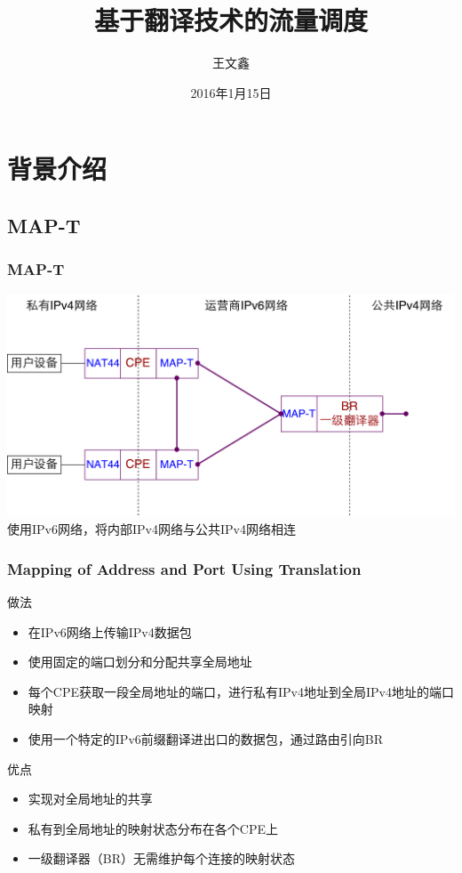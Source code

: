 \documentclass{beamer}
\title{基于翻译技术的流量调度}
\author{王文鑫}
\date{2016年1月15日}
\begin{document}
\begin{frame}
  \titlepage
\end{frame}

\section{背景介绍}
\subsection{MAP-T}

\begin{frame}
  \frametitle{MAP-T}

  \includegraphics[width=\textwidth]{figs/MAP-T.pdf}  
  \vspace{1.5em}
  使用IPv6网络，将内部IPv4网络与公共IPv4网络相连
\end{frame}

\begin{frame}
  \frametitle{Mapping of Address and Port Using Translation}

  \begin{block}{做法}
    \begin{itemize}
    \item 在IPv6网络上传输IPv4数据包
    \item 使用固定的端口划分和分配共享全局地址
    \item 每个CPE获取一段全局地址的端口，进行私有IPv4地址到全局IPv4地址的端口映射
    \item 使用一个特定的IPv6前缀翻译进出口的数据包，通过路由引向BR
    \end{itemize}
  \end{block}

  \begin{block}{优点}
    \begin{itemize}
    \item 实现对全局地址的共享
    \item 私有到全局地址的映射状态分布在各个CPE上
    \item 一级翻译器（BR）无需维护每个连接的映射状态
    \end{itemize}
  \end{block}

\end{frame}
\end{document}
